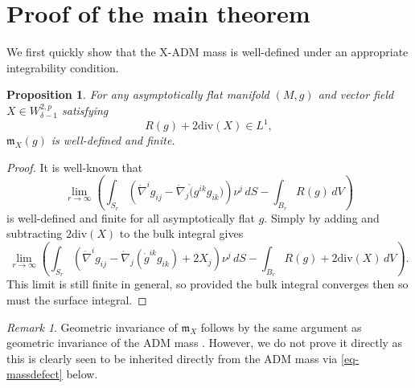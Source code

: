 \documentclass[a4paper,11pt,reqno]{amsart}
\theoremstyle{plain}
\newtheorem{prop}[thm]{Proposition}
\theoremstyle{definition}
\theoremstyle{remark}
\newtheorem{rem}[thm]{Remark}
\newcommand{\m}{\mathfrak{m}}
\def\onabla{\mathring \nabla}
\numberwithin{equation}{section}
\begin{document}
\section{Proof of the main theorem}
We first quickly show that the X-ADM mass is well-defined under an appropriate integrability condition.
\begin{prop}\label{prop-welldefmE}
	For any asymptotically flat manifold $(M,g)$ and vector field $X\in W^{2,p}_{\delta-1}$ satisfying
	\begin{equation*}
		R(g)+2\mathrm{div}(X)\in L^1,
	\end{equation*}
	$\m_X(g)$ is well-defined and finite.
\end{prop} 
\begin{proof}
	It is well-known that
	\begin{equation*}
		\lim_{r\to\infty}\left( \int_{S_r}\left( \onabla^ig_{ij}-\onabla_j\mathring (g^{ik}g_{ik})\right)\nu^j\,dS-\int_{B_r}R(g)\,dV\right)
	\end{equation*}
	is well-defined and finite for all asymptotically flat $g$. Simply by adding and subtracting $2\mathrm{div}(X)$ to the bulk integral gives
\begin{equation*}
	\lim_{r\to\infty}\left( \int_{S_r}\left( \onabla^ig_{ij}-\onabla_j(\mathring g^{ik}g_{ik})+2X_j\right)\nu^j\,dS-\int_{B_r}R(g)+2\mathrm{div}(X)\,dV\right).
\end{equation*}
This limit is still finite in general, so provided the bulk integral converges then so must the surface integral.
\end{proof}
\begin{rem}
	Geometric invariance of $\m_X$ follows by the same argument as geometric invariance of the ADM mass \cite{Bartnik86,Chrusciel1986}. However, we do not prove it directly as this is clearly seen to be inherited directly from the ADM mass via \eqref{eq-massdefect} below.
\end{rem}
\end{document}
